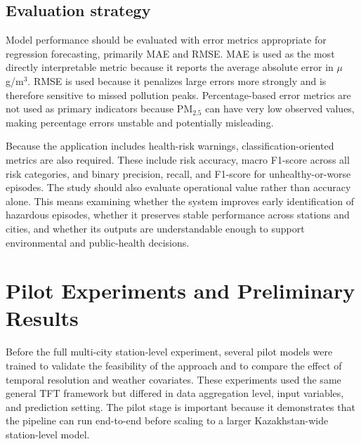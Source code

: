 \documentclass[pdflatex,sn-mathphys-num]{sn-jnl}
\begin{document}
\subsection{Evaluation strategy}\label{subsec:evaluation}

Model performance should be evaluated with error metrics appropriate for regression forecasting, primarily MAE and RMSE. MAE is used as the most directly interpretable metric because it reports the average absolute error in $\mu$g/m$^3$. RMSE is used because it penalizes large errors more strongly and is therefore sensitive to missed pollution peaks. Percentage-based error metrics are not used as primary indicators because PM$_{2.5}$ can have very low observed values, making percentage errors unstable and potentially misleading.

Because the application includes health-risk warnings, classification-oriented metrics are also required. These include risk accuracy, macro F1-score across all risk categories, and binary precision, recall, and F1-score for unhealthy-or-worse episodes. The study should also evaluate operational value rather than accuracy alone. This means examining whether the system improves early identification of hazardous episodes, whether it preserves stable performance across stations and cities, and whether its outputs are understandable enough to support environmental and public-health decisions.

\section{Pilot Experiments and Preliminary Results}\label{sec:pilot}

Before the full multi-city station-level experiment, several pilot models were trained to validate the feasibility of the approach and to compare the effect of temporal resolution and weather covariates. These experiments used the same general TFT framework but differed in data aggregation level, input variables, and prediction setting. The pilot stage is important because it demonstrates that the pipeline can run end-to-end before scaling to a larger Kazakhstan-wide station-level model.
\end{document}
